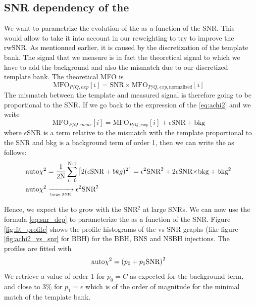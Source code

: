 
\subsection{SNR dependency of the \texorpdfstring{\achi}{autoChi2}}
\label{sec:snr_dependency}

We want to parametrize the evolution of the \achi as a function of the SNR.
This would allow to take it into account in our reweighting to try to improve the rwSNR.
As mentionned earlier, it is caused by the discretization of the template bank.
The signal that we measure is in fact the theoretical signal to which we have to add the background and also the mismatch due to our discretized template bank.
The theoretical MFO is 
%
\begin{equation}
    \textrm{MFO}_{P/Q,exp}[i] = \textrm{SNR} \times \textrm{MFO}_{P/Q,exp,\text{normalized}}[i]
\end{equation}
%
The mismatch between the template and measured signal is therefore going to be proportional to the SNR.
If we go back to the expression of the \achi \ref{eq:achi2} and we write
%
\begin{equation}
\label{rewrite_mfo}
    \textrm{MFO}_{P/Q,meas}[i] = \textrm{MFO}_{P/Q,exp}[i] + \epsilon \textrm{SNR} + \textrm{bkg}
\end{equation}
%
where $\epsilon \textrm{SNR}$ is a term relative to the mismatch with the template proportional to the SNR and bkg is a background term of order 1, then we can write the \achi as follows:
%
\begin{align}
\label{eq:snr_dep}
    \textrm{auto$\chi^2$} &= \frac{1}{2\textrm{N}} \sum_{i=0}^{\textrm{N-1}} \left[  2(\epsilon\textrm{SNR}+bkg)^2 \right] = \epsilon^2 \textrm{SNR}^2 +2\epsilon\textrm{SNR$\times$bkg}+\textrm{bkg}^2\\
    \textrm{auto$\chi^2$} &\xrightarrow[\textrm{{\tiny large SNR}}]{} \epsilon^2\textrm{SNR}^2
\end{align}
%

Hence, we expect the \achi to grow with the SNR$^2$ at large SNRs.
We can now use the formula \ref{eq:snr_dep} to parameterize the \achi as a function of the SNR. 
Figure \ref{fig:fit_profile} shows the profile histograms of the \achi vs SNR graphs (like figure \ref{fig:achi2_vs_snr} for BBH) for the BBH, BNS and NSBH injections.
The profiles are fitted with
%
\begin{equation}
\label{eq:fit}
    \textrm{auto$\chi^2$} = \left(p_0 + p_1 \textrm{SNR} \right)^2
\end{equation}
%
We retrieve a value of order 1 for $p_0 = C$ as expected for the background term, and close to 3\% for $p_1 = \epsilon$ which is of the order of magnitude for the minimal match of the template bank.
%


